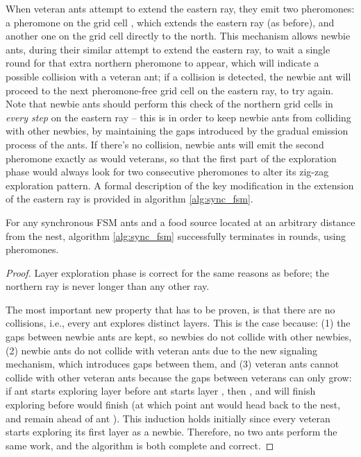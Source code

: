 When veteran ants attempt to extend the eastern ray, they emit two
pheromones: a pheromone on the grid cell , which extends the eastern ray
 (as before), and another one on the grid cell  directly to the north. 
This mechanism allows newbie ants, during their similar attempt to extend the eastern ray, to wait a
 single round for that extra northern pheromone to appear, which will indicate a possible collision
 with a veteran ant;
if a collision is detected, the newbie ant will proceed to the next pheromone-free
grid cell on the eastern ray, to try again. Note that newbie ants should perform this check
of the northern grid cells in \emph{every step} on the eastern ray --
this is in order to keep newbie ants from colliding with other newbies, by maintaining the gaps introduced by the gradual
emission process of the ants.
 If there's no collision, newbie ants will emit the second pheromone exactly as would
veterans, so that the first part of the exploration phase would always look for two consecutive pheromones
to alter its zig-zag exploration pattern.
A formal description of the key modification in the extension of the eastern ray is provided in algorithm \ref{alg:sync_fsm}.

\begin{theorem}
\label{thm:sync_fsm}
For any  synchronous FSM ants and a food
 source located at an arbitrary distance  from the nest, 
 algorithm \ref{alg:sync_fsm} successfully terminates in 
rounds, using  pheromones.
\end{theorem}

\begin{proof}
Layer exploration phase is correct for the same reasons as before; the northern ray is never
longer than any other ray.

The most important new property that has to be proven, is that there are no collisions, i.e.,
every ant explores distinct layers. This is the case because:
(1) the gaps between newbie ants are kept, so newbies do not collide with other newbies, 
(2) newbie ants do not collide with veteran ants due to the new signaling mechanism, 
which introduces gaps between them, and
(3) veteran ants cannot collide with other veteran ants because the gaps between veterans 
can only grow: if ant  starts exploring layer  before ant  starts layer , then 
, and  will finish exploring  before  would finish  (at which
point ant  would head back to the nest, and remain ahead of ant ). This induction
 holds initially since every veteran starts exploring its first layer as a newbie.
Therefore, no two ants perform the same work, and the algorithm is both complete 
and correct.
\end{proof}
